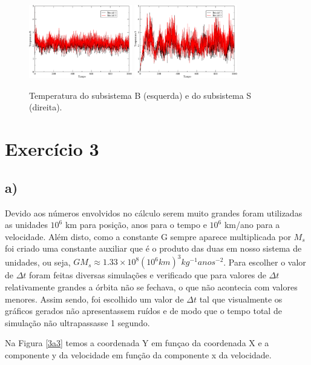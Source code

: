 \documentclass[a4wide]{report}
\begin{document}
\begin{figure}[!htb]
\centering
\includegraphics[width=0.4\textwidth]{tempB.pdf}
\includegraphics[width=0.4\textwidth]{tempS.pdf}
\caption{Temperatura do subsistema B (esquerda) e do subsistema S (direita).}
\label{2e2}
\end{figure}


\section*{Exercício 3}
\subsection*{a)}
Devido aos números envolvidos no cálculo serem muito grandes foram utilizadas as unidades $10^6$ km para posição, anos para o tempo e $10^6$ km/ano para a velocidade. Além disto, como a constante G sempre aparece multiplicada por $M_s$ foi criado uma constante auxiliar que é o produto das duas em nosso sistema de unidades, ou seja, $GM_s \approx 1.33 \times 10^8  (10^6 km)^3kg^{-1}anos^{-2}$. Para escolher o valor de $\Delta t$ foram feitas diversas simulações e verificado que para valores de $\Delta t$ relativamente grandes a órbita não se fechava, o que não acontecia com valores menores. Assim sendo, foi escolhido um valor de $\Delta t$ tal que visualmente os gráficos gerados não apresentassem ruídos e de modo que o tempo total de simulação não ultrapassasse 1 segundo.

Na Figura \ref{3a3} temos a coordenada Y em funçao da coordenada X e a componente y da velocidade em função da componente x da velocidade.
\end{document}
